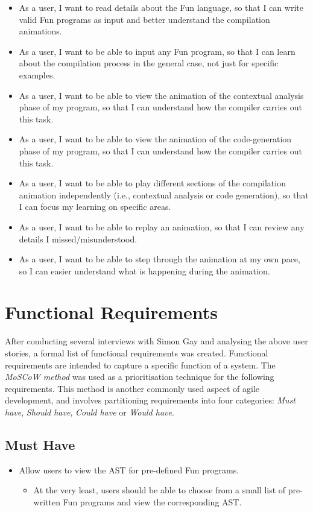 \documentclass{l4proj}
\begin{document}
\begin{itemize}
\item As a user, I want to read details about the Fun language, so that I can write valid Fun programs as input and better understand the compilation animations.
\item As a user, I want to be able to input any Fun program, so that I can learn about the compilation process in the general case, not just for specific examples.
\item As a user, I want to be able to view the animation of the contextual analysis phase of my program, so that I can understand how the compiler carries out this task.
\item As a user, I want to be able to view the animation of the code-generation phase of my program, so that I can understand how the compiler carries out this task.
\item As a user, I want to be able to play different sections of the compilation animation independently (i.e., contextual analysis or code generation), so that I can focus my learning on specific areas. 
\item As a user, I want to be able to replay an animation, so that I can review any details I missed/misunderstood.
\item As a user, I want to be able to step through the animation at my own pace, so I can easier understand what is happening during the animation.
\end{itemize}

\section{Functional Requirements}
After conducting several interviews with Simon Gay and analysing the above user stories, a formal list of functional requirements was created. Functional requirements are intended to capture a specific function of a system. The \textit {MoSCoW method} was used as a prioritisation technique for the following requirements. This method is another commonly used aspect of agile development, and involves partitioning requirements into four categories: \textit{Must have}, \textit{Should have}, \textit{Could have} or \textit{Would have}.
\subsection{Must Have}
\begin{itemize}
\item Allow users to view the AST for pre-defined Fun programs.
\begin{itemize}
\item At the very least, users should be able to choose from a small list of pre-written Fun programs and view the corresponding AST.
\end{itemize}
\end{itemize}
\end{document}
